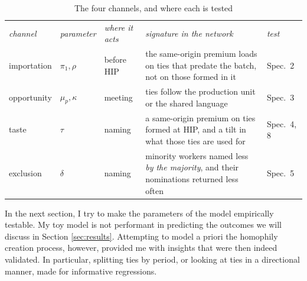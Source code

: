 \begin{table}[h!]
\centering
\caption{The four channels, and where each is tested}
\label{tab:mapping}
\footnotesize
\begin{tabular}{lllp{}l}
\textit{channel} & \textit{parameter} & \textit{where it acts} & \textit{signature in the network} & \textit{test} \\
\dmidrule
importation & $\pi_1, \rho$ & before HIP & the same-origin premium loads on ties that predate the batch, not on those formed in it & Spec.~2 \\
\medskip
opportunity & $\mu_p, \kappa$ & meeting & ties follow the production unit or the shared language & Spec.~3 \\
\medskip
taste & $\tau$ & naming & a same-origin premium on ties formed at HIP, and a tilt in what those ties are used for & Spec.~4, 8 \\
\medskip
exclusion & $\delta$ & naming & minority workers named less \textit{by the majority}, and their nominations returned less often & Spec.~5 \\
\bottomrule
\end{tabular}
\end{table}
\FloatBarrier


\noindent In the next section, I try to make the parameters of the model empirically testable. My toy model is not performant in predicting the outcomes we will discuss in Section \ref{sec:results}. Attempting to model a priori the homophily creation process, however, provided me with insights that were then indeed validated. In particular, splitting ties by period, or looking at ties in a directional manner, made for informative regressions.